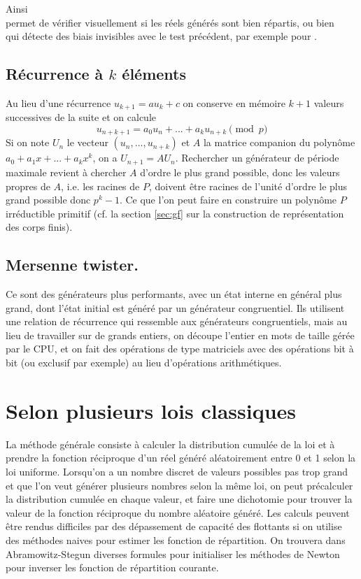 \documentclass[a4paper,11pt]{book}
\begin{document}
\begin{giacjshere}
Ainsi \\
permet de v\'erifier visuellement si les r\'eels g\'en\'er\'es sont
bien r\'epartis, ou bien\\
qui d\'etecte des biais invisibles avec le test pr\'ec\'edent, par
exemple pour 
.

\subsection{R\'ecurrence \`a $k$ \'el\'ements}
Au lieu d'une r\'ecurrence $u_{k+1}=au_k+c$ on conserve en m\'emoire
$k+1$ valeurs successives de la suite et on calcule
$$ u_{n+k+1} = a_0 u_n+...+a_{k}u_{n+k} \pmod p$$
Si on note $U_n$ le vecteur $(u_n,...,u_{n+k})$ et $A$
la matrice companion du polyn\^ome $a_0+a_1x+...+a_kx^k$,
on a $U_{n+1}=AU_n$. Rechercher un g\'en\'erateur de p\'eriode
maximale revient \`a chercher $A$ d'ordre le plus grand possible, donc
les valeurs propres de $A$, i.e. les racines de $P$, doivent \^etre
racines de l'unit\'e d'ordre le plus grand possible donc $p^k-1$. 
Ce que l'on peut faire en construire un polyn\^ome $P$ irr\'eductible
primitif (cf. la section \ref{sec:gf} sur la construction de repr\'esentation
des corps finis).

\subsection{Mersenne twister.}
Ce sont des générateurs plus performants, avec un état interne
en général plus grand, dont l'état initial est généré par
un générateur congruentiel. Ils utilisent une relation
de r\'ecurrence qui ressemble aux g\'en\'erateurs
congruentiels, mais au lieu de travailler sur de grands
entiers, on d\'ecoupe l'entier en mots de taille g\'er\'ee
par le CPU, et on fait des op\'erations de type matriciels
avec des op\'erations bit \`a bit (ou exclusif par exemple)
au lieu d'op\'erations arithm\'etiques.

\section{Selon plusieurs lois classiques}
La m\'ethode g\'en\'erale consiste \`a calculer la distribution
cumul\'ee de la loi et \`a prendre la fonction r\'eciproque
d'un r\'eel g\'en\'er\'e al\'eatoirement entre 0 et 1 selon
la loi uniforme. Lorsqu'on a un nombre discret de valeurs possibles
pas trop grand et que l'on veut g\'en\'erer plusieurs
nombres selon la m\^eme loi, on peut pr\'ecalculer la distribution cumul\'ee
en chaque valeur, et faire une dichotomie pour trouver
la valeur de la fonction r\'eciproque du nombre al\'eatoire
g\'en\'er\'e. Les calculs peuvent être rendus difficiles
par des dépassement de capacité des flottants si on utilise
des méthodes naives pour estimer les fonction de répartition.
On trouvera dans Abramowitz-Stegun diverses formules 
pour initialiser les méthodes de Newton pour inverser les
fonction de répartition courante.


\end{giacjshere}
\end{document}
